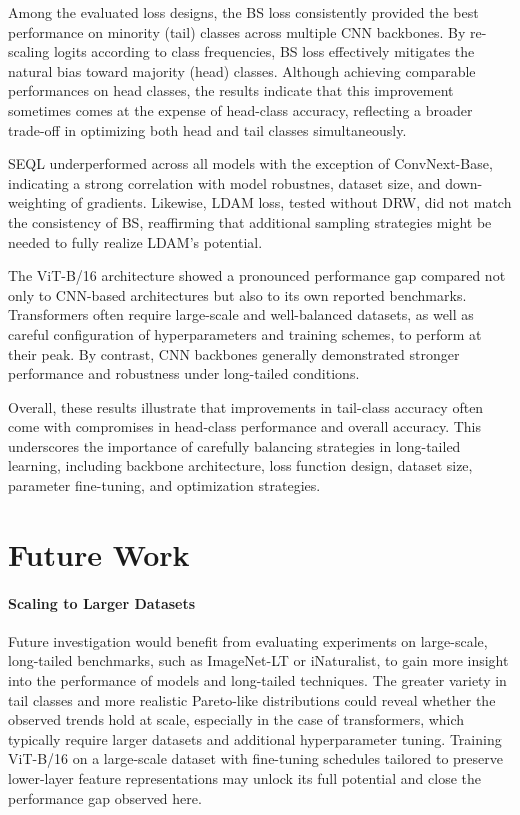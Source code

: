 Among the evaluated loss designs, the BS loss consistently provided the best performance on minority (tail) classes across multiple CNN backbones. By re-scaling logits according to class frequencies, BS loss effectively mitigates the natural bias toward majority (head) classes. Although achieving comparable performances on head classes, the results indicate that this improvement sometimes comes at the expense of head-class accuracy, reflecting a broader trade-off in optimizing both head and tail classes simultaneously. 


SEQL underperformed across all models with the exception of ConvNext-Base, indicating a strong correlation with model robustnes, dataset size, and down-weighting of gradients. Likewise, LDAM loss, tested without DRW, did not match the consistency of BS, reaffirming that additional sampling strategies might be needed to fully realize LDAM's potential.

The ViT-B/16 architecture showed a pronounced performance gap compared not only to CNN-based architectures but also to its own reported benchmarks. Transformers often require large-scale and well-balanced datasets, as well as careful configuration of hyperparameters and training schemes, to perform at their peak. By contrast, CNN backbones generally demonstrated stronger performance and robustness under long-tailed conditions.

\noindent Overall, these results illustrate that improvements in tail-class accuracy often come with compromises in head-class performance and overall accuracy. This underscores the importance of carefully balancing strategies in long-tailed learning, including backbone architecture, loss function design, dataset size, parameter fine-tuning, and optimization strategies.

\section{Future Work}
\paragraph{Scaling to Larger Datasets}
Future investigation would benefit from evaluating experiments on large-scale, long-tailed benchmarks, such as ImageNet-LT or iNaturalist, to gain more insight into the performance of models and long-tailed techniques. The greater variety in tail classes and more realistic Pareto-like distributions could reveal whether the observed trends hold at scale, especially in the case of transformers, which typically require larger datasets and additional hyperparameter tuning. Training ViT-B/16 on a large-scale dataset with fine-tuning schedules tailored to preserve lower-layer feature representations may unlock its full potential and close the performance gap observed here.

